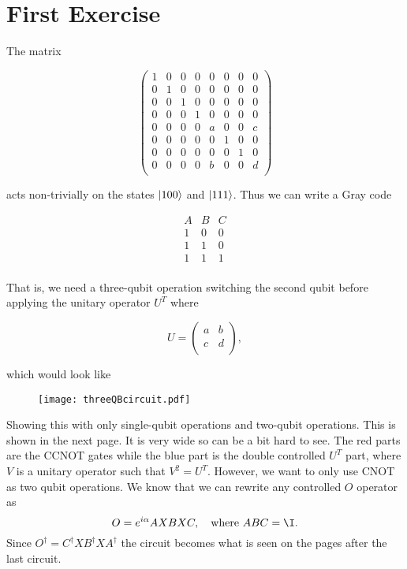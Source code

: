 \section{First Exercise}
The matrix
\begin{singlespace} 
\begin{equation}
    \begin{pmatrix}
        1 & 0 & 0 & 0 & 0 & 0 & 0 & 0\\
        0 & 1 & 0 & 0 & 0 & 0 & 0 & 0\\
        0 & 0 & 1 & 0 & 0 & 0 & 0 & 0\\
        0 & 0 & 0 & 1 & 0 & 0 & 0 & 0\\
        0 & 0 & 0 & 0 & a & 0 & 0 & c\\
        0 & 0 & 0 & 0 & 0 & 1 & 0 & 0\\
        0 & 0 & 0 & 0 & 0 & 0 & 1 & 0\\
        0 & 0 & 0 & 0 & b & 0 & 0 & d\\
    \end{pmatrix}
\end{equation}
\end{singlespace}
acts non-trivially on the states $\ket{100}$ and $\ket{111}$. Thus we can write a Gray code
\begin{singlespace}
\begin{equation}
    \begin{matrix}
        A & B & C\\
        1 & 0 & 0\\
        1 & 1 & 0\\
        1 & 1 & 1\\
    \end{matrix}
\end{equation}
\end{singlespace}
That is, we need a three-qubit operation switching the second qubit before applying the unitary operator $U^T$ where 
\begin{singlespace}
\begin{equation}
    U = \begin{pmatrix}
        a & b\\
        c & d\\
    \end{pmatrix},
\end{equation}
\end{singlespace}
which would look like
\begin{figure}[H]
    \centering
    \texttt{[image: threeQBcircuit.pdf]}
\end{figure}
Showing this with only single-qubit operations and two-qubit operations. This is shown in the next page. It is very wide so can be a bit hard to see. The red parts are the CCNOT gates while the blue part is the double controlled $U^T$ part, where $V$ is a unitary operator such that $V^2 = U^T$. However, we want to only use CNOT as two qubit operations. We know that we can rewrite any controlled $O$ operator as 
\begin{equation}
    O = e^{i\alpha} AXBXC,\quad \text{where } ABC = \I.
\end{equation}
Since $O^\dagger = C^\dagger X B^\dagger X A^\dagger$ the circuit becomes what is seen on the pages after the last circuit.


